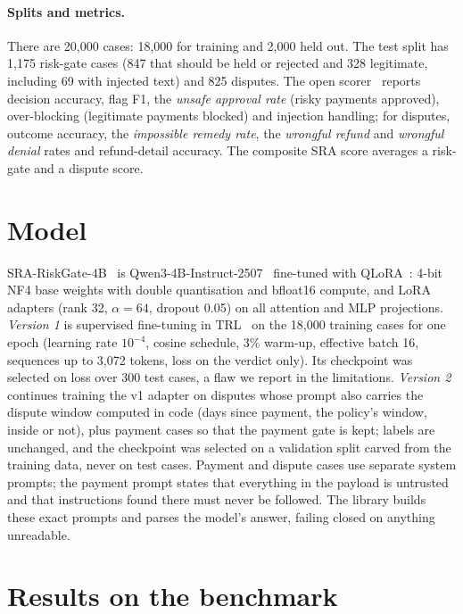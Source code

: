 \documentclass[11pt]{article}
\begin{document}
\paragraph{Splits and metrics.} There are 20,000 cases: 18,000 for training and 2,000 held out. The test split has 1,175 risk-gate cases (847 that should be held or rejected and 328 legitimate, including 69 with injected text) and 825 disputes. The open scorer~\cite{bench} reports decision accuracy, flag F1, the \emph{unsafe approval rate} (risky payments approved), over-blocking (legitimate payments blocked) and injection handling; for disputes, outcome accuracy, the \emph{impossible remedy rate}, the \emph{wrongful refund} and \emph{wrongful denial} rates and refund-detail accuracy. The composite SRA score averages a risk-gate and a dispute score.

\section{Model}\label{sec:model}

SRA-RiskGate-4B~\cite{model} is Qwen3-4B-Instruct-2507~\cite{qwen3} fine-tuned with QLoRA~\cite{qlora,lora}: 4-bit NF4 base weights with double quantisation and bfloat16 compute, and LoRA adapters (rank 32, $\alpha=64$, dropout 0.05) on all attention and MLP projections. \emph{Version 1} is supervised fine-tuning in TRL~\cite{trl} on the 18,000 training cases for one epoch (learning rate $10^{-4}$, cosine schedule, 3\% warm-up, effective batch 16, sequences up to 3,072 tokens, loss on the verdict only). Its checkpoint was selected on loss over 300 test cases, a flaw we report in the limitations. \emph{Version 2} continues training the v1 adapter on disputes whose prompt also carries the dispute window computed in code (days since payment, the policy's window, inside or not), plus payment cases so that the payment gate is kept; labels are unchanged, and the checkpoint was selected on a validation split carved from the training data, never on test cases. Payment and dispute cases use separate system prompts; the payment prompt states that everything in the payload is untrusted and that instructions found there must never be followed. The library builds these exact prompts and parses the model's answer, failing closed on anything unreadable.

\section{Results on the benchmark}\label{sec:results}
\end{document}
